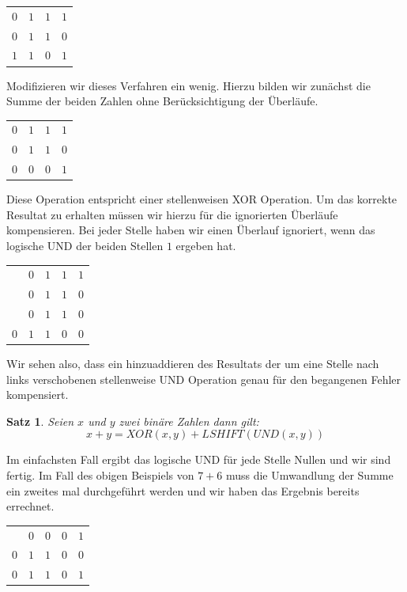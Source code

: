 \documentclass[11pt,a4paper,leqno]{report}
\newtheorem{proposition}{Satz}[chapter]
\numberwithin{equation}{chapter}
\begin{document}
\begin{center}
	\begin{tabular}{c c c c}
		$0$ & $1$ & $1$ & $1$\\
		$0$ & $1$ & $1$ & $0$\\
		\hline
		$1$& $1$ & $0$ & $1$\\
	\end{tabular}  
\end{center}
\noindent
Modifizieren wir dieses Verfahren ein wenig. Hierzu bilden wir zun\"achst die Summe der beiden Zahlen ohne Ber\"ucksichtigung der \"Uberl\"aufe.
\begin{center}
	\begin{tabular}{c c c c}
		$0$ & $1$ & $1$ & $1$\\
		$0$ & $1$ & $1$ & $0$\\
		\hline
		$0$& $0$ & $0$ & $1$\\
	\end{tabular}  
\end{center}
\noindent
Diese Operation entspricht einer stellenweisen XOR Operation. Um das korrekte Resultat zu erhalten m\"ussen wir hierzu f\"ur die ignorierten \"Uberl\"aufe kompensieren. Bei jeder Stelle haben wir einen \"Uberlauf ignoriert, wenn das logische UND der beiden Stellen $1$ ergeben hat. 
\begin{center}
	\begin{tabular}{c c c c c}
		&$0$ & $1$ & $1$ & $1$\\
		&$0$ & $1$ & $1$ & $0$\\
		\hline
		&$0$& $1$ & $1$ & $0$\\
				\hline
		$0$&$1$& $1$ & $0$ & $0$\\
	\end{tabular}  
\end{center}
\noindent
Wir sehen also, dass ein hinzuaddieren des Resultats der um eine Stelle nach links verschobenen stellenweise UND Operation genau f\"ur den begangenen Fehler kompensiert.
\begin{proposition}
	Seien $x$ und $y$ zwei bin\"are Zahlen dann gilt:
	$$x + y = XOR(x,y) + LSHIFT(UND(x,y))$$
\end{proposition}
\noindent
Im einfachsten Fall ergibt das logische UND f\"ur jede Stelle Nullen und wir sind fertig. Im Fall des obigen Beispiels von $7 + 6$ muss die Umwandlung der Summe ein zweites mal durchgef\"uhrt werden und wir haben das Ergebnis bereits errechnet.
\begin{center}
	\begin{tabular}{c c c c c}
		&$0$& $0$ & $0$ & $1$\\
		$0$&$1$& $1$ & $0$ & $0$\\
		\hline
		$0$&$1$& $1$ & $0$ & $1$\\
	\end{tabular}  
\end{center}
\end{document}
